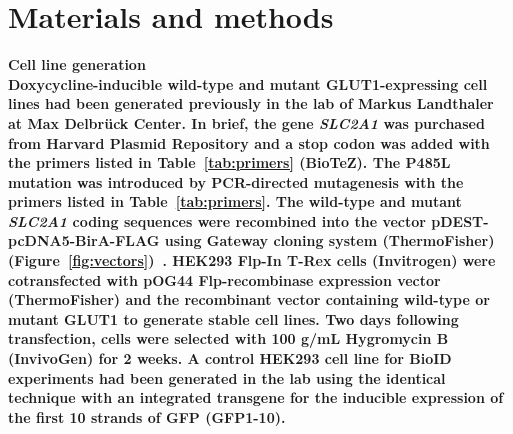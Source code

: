 
\chapter{Materials and methods} %
\label{Chapter2} %

\bfseries{Cell line generation}\\
\normalfont Doxycycline-inducible wild-type and mutant GLUT1-expressing cell lines had been generated previously in the lab of Markus Landthaler at Max Delbr\"{u}ck Center. In brief, the gene \textit{SLC2A1} was purchased from Harvard Plasmid Repository and a stop codon was added with the primers listed in Table~\ref{tab:primers} (BioTeZ). The P485L mutation was introduced by PCR-directed mutagenesis with the primers listed in Table~\ref{tab:primers}. The wild-type and mutant \textit{SLC2A1} coding sequences were recombined into the vector pDEST-pcDNA5-BirA-FLAG using Gateway cloning system (ThermoFisher) (Figure~\ref{fig:vectors})~\cite{Couzens}. HEK293 Flp-In T-Rex cells (Invitrogen) were cotransfected with pOG44 Flp-recombinase expression vector (ThermoFisher) and the recombinant vector containing wild-type or mutant GLUT1 to generate stable cell lines. Two days following transfection, cells were selected with 100 \textmu g/mL Hygromycin B (InvivoGen) for 2 weeks. A control HEK293 cell line for BioID experiments had been generated in the lab using the identical technique with an integrated transgene for the inducible expression of the first 10 strands of GFP (GFP1-10).


